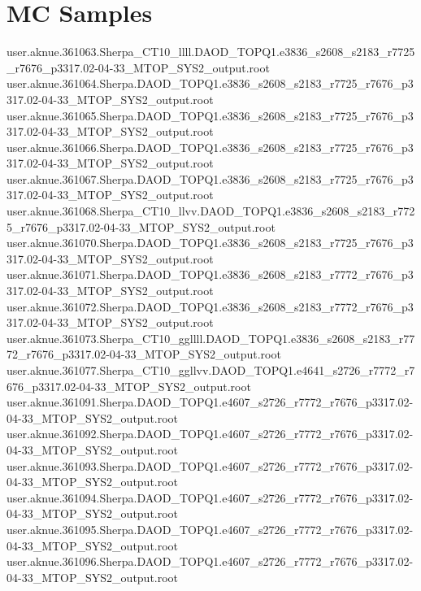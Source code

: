 \section{MC Samples}
{\scriptsize
user.aknue.361063.Sherpa_CT10_llll.DAOD_TOPQ1.e3836_s2608_s2183_r7725_r7676_p3317.02-04-33_MTOP_SYS2_output.root\\
user.aknue.361064.Sherpa.DAOD_TOPQ1.e3836_s2608_s2183_r7725_r7676_p3317.02-04-33_MTOP_SYS2_output.root\\
user.aknue.361065.Sherpa.DAOD_TOPQ1.e3836_s2608_s2183_r7725_r7676_p3317.02-04-33_MTOP_SYS2_output.root\\
user.aknue.361066.Sherpa.DAOD_TOPQ1.e3836_s2608_s2183_r7725_r7676_p3317.02-04-33_MTOP_SYS2_output.root\\
user.aknue.361067.Sherpa.DAOD_TOPQ1.e3836_s2608_s2183_r7725_r7676_p3317.02-04-33_MTOP_SYS2_output.root\\
user.aknue.361068.Sherpa_CT10_llvv.DAOD_TOPQ1.e3836_s2608_s2183_r7725_r7676_p3317.02-04-33_MTOP_SYS2_output.root\\
user.aknue.361070.Sherpa.DAOD_TOPQ1.e3836_s2608_s2183_r7725_r7676_p3317.02-04-33_MTOP_SYS2_output.root\\
user.aknue.361071.Sherpa.DAOD_TOPQ1.e3836_s2608_s2183_r7772_r7676_p3317.02-04-33_MTOP_SYS2_output.root\\
user.aknue.361072.Sherpa.DAOD_TOPQ1.e3836_s2608_s2183_r7772_r7676_p3317.02-04-33_MTOP_SYS2_output.root\\
user.aknue.361073.Sherpa_CT10_ggllll.DAOD_TOPQ1.e3836_s2608_s2183_r7772_r7676_p3317.02-04-33_MTOP_SYS2_output.root\\
user.aknue.361077.Sherpa_CT10_ggllvv.DAOD_TOPQ1.e4641_s2726_r7772_r7676_p3317.02-04-33_MTOP_SYS2_output.root\\
user.aknue.361091.Sherpa.DAOD_TOPQ1.e4607_s2726_r7772_r7676_p3317.02-04-33_MTOP_SYS2_output.root\\
user.aknue.361092.Sherpa.DAOD_TOPQ1.e4607_s2726_r7772_r7676_p3317.02-04-33_MTOP_SYS2_output.root\\
user.aknue.361093.Sherpa.DAOD_TOPQ1.e4607_s2726_r7772_r7676_p3317.02-04-33_MTOP_SYS2_output.root\\
user.aknue.361094.Sherpa.DAOD_TOPQ1.e4607_s2726_r7772_r7676_p3317.02-04-33_MTOP_SYS2_output.root\\
user.aknue.361095.Sherpa.DAOD_TOPQ1.e4607_s2726_r7772_r7676_p3317.02-04-33_MTOP_SYS2_output.root\\
user.aknue.361096.Sherpa.DAOD_TOPQ1.e4607_s2726_r7772_r7676_p3317.02-04-33_MTOP_SYS2_output.root\\
}
